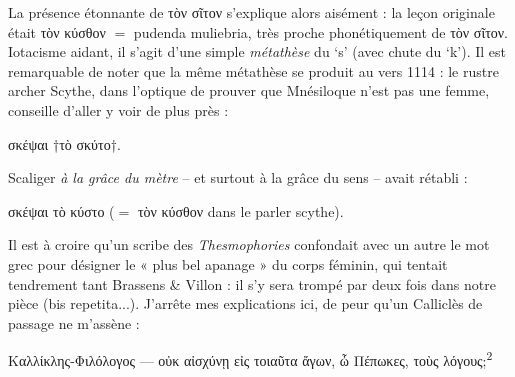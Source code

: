 \documentclass[12pt]{book}%
\newcommand{\italique}[1]{\textit{#1}}%
\newcommand{\citComm}[1]{\begin{quoting}[vskip=0pt] #1 \end{quoting}}%
\newcommand{\latin}[1]{{\policeLat #1}}%
\newcommand{\marqueur}[1]{\textsuperscript{#1}}%
\newenvironment{groupe}{%
\pstart%
\ledgroup%
}{%
\pend %
}%
\begin{document}
\begin{pages}
\begin{Leftside}
\begin{groupe}
{{La présence étonnante de τὸν σῖτον s'explique alors aisément : la leçon originale était τὸν κύσθον $=$ \latin{pudenda muliebria}, très proche phonétiquement de τὸν σῖτον. 
Iotacisme aidant, il s'agit d'une simple \italique{métathèse} du `s' (avec chute du `k').
Il est remarquable de noter que la même métathèse se produit au vers 1114 : le rustre archer Scythe, dans l'optique de prouver que Mnésiloque n'est pas une femme, conseille d'aller y voir de plus près :%
\citComm{σκέψαι †τὸ σκύτο†.}%
Scaliger \italique{à la grâce du mètre} -- et surtout à la grâce du sens -- avait rétabli :%
\citComm{σκέψαι τὸ κύστο ($=$ τὸν κύσθον dans le parler scythe).}%
Il est à croire qu'un scribe des \italique{Thesmophories} confondait avec un autre le mot grec pour désigner le « plus bel apanage » du corps féminin, qui tentait tendrement tant Brassens \& Villon : il s'y sera trompé par deux fois dans notre pièce (\latin{bis repetita...}).
J'arrête mes explications ici, de peur qu'un Calliclès de passage ne m'assène :%
\citComm{Καλλίκλης-Φιλόλογος --- οὐκ αἰσχύνῃ εἰς τοιαῦτα ἄγων, ὦ Πέπωκες, τοὺς λόγους;\marqueur{2}}%
}}
\end{groupe}
\end{Leftside}
\end{pages}
\end{document}
